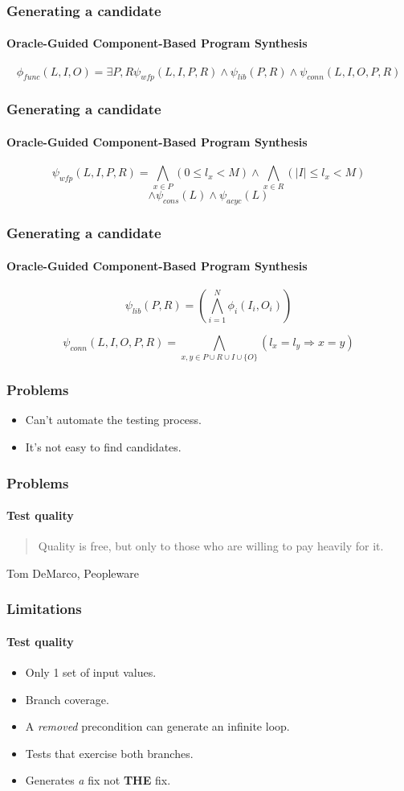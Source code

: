 \documentclass{beamer}
\begin{document}
\frame
{
  \frametitle{Generating a candidate}
  \framesubtitle{Oracle-Guided Component-Based Program Synthesis}
\begin{equation*}
\phi_{func}(L, I, O) = \exists P, R \psi_{wfp}(L, I, P, R) \wedge \psi_{lib}(P, R) \wedge \psi_{conn}(L, I, O, P, R)
\end{equation*}
}


\frame
{
  \frametitle{Generating a candidate}
  \framesubtitle{Oracle-Guided Component-Based Program Synthesis}
\begin{equation*}
\psi_{wfp}(L, I, P, R) = \bigwedge_{x \in P} (0 \leq l_x < M) \wedge \bigwedge_{x \in R} (|I| \leq l_x < M)
\end{equation*}
\begin{equation*}
\wedge \psi_{cons}(L) \wedge \psi_{acyc}(L)
\end{equation*}
}

\frame
{
  \frametitle{Generating a candidate}
  \framesubtitle{Oracle-Guided Component-Based Program Synthesis}
\begin{equation*}
\psi_{lib}(P, R) = \left( \bigwedge^N_{i=1} \phi_i(I_i, O_i) \right)
\end{equation*}

\begin{equation*}
\psi_{conn}(L, I, O, P, R) = \bigwedge_{x, y \in P \cup R \cup I \cup \{O\}} (l_x = l_y \Rightarrow x = y)
\end{equation*}
}

  \frame
  {
    \frametitle{Problems}
\begin{itemize}
\item Can't automate the testing process.
\item It's not easy to find candidates.
\end{itemize}    
  }

  \frame
  {
    \frametitle{Problems}
    \framesubtitle{Test quality}
   \begin{quote}
    Quality is free, but only to those who are willing to pay heavily for it.
   \end{quote}
    Tom DeMarco, Peopleware   
  }
  
  \frame
  {
    \frametitle{Limitations}
    \framesubtitle{Test quality}
\begin{itemize}
\item Only 1 set of input values.
\item Branch coverage.
\item A \textit{removed} precondition can generate an infinite loop.
\item Tests that exercise both branches.
\item Generates \textit{a} fix not \textbf{THE} fix.
\end{itemize}        
  }
\end{document}

